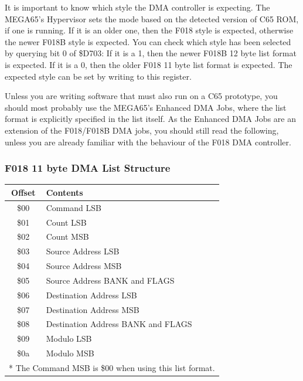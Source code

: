 It is important to know which style the DMA controller is expecting.  The MEGA65's Hypervisor sets the mode based on
the detected version of C65 ROM, if one is running. If it is an older one, then the F018 style is expected, otherwise
the newer F018B style is expected.  You can check which style has been selected by querying bit 0 of \$D703: If it is
a 1, then the newer F018B 12 byte list format is expected. If it is a 0, then the older F018 11 byte list format is expected.
The expected style can be set by writing to this register.

Unless you are writing software that must also run
on a C65 prototype, you should most probably use the MEGA65's Enhanced DMA Jobs, where the list format is explicitly specified
in the list itself.  As the Enhanced DMA Jobs are an extension of the F018/F018B DMA jobs, you should still read the following,
unless you are already familiar with the behaviour of the F018 DMA controller.

\subsubsection{F018 11 byte DMA List Structure}
\begin{center}
\begin{tabular}{|c|l|}
  \hline
  Offset & Contents \\
  \hline
  \$00 & Command LSB \\
  \$01 & Count LSB \\
  \$02 & Count MSB \\
  \$03 & Source Address LSB  \\
  \$04 & Source Address MSB \\
  \$05 & Source Address BANK and FLAGS \\
  \$06 & Destination Address LSB  \\
  \$07 & Destination Address MSB \\
  \$08 & Destination Address BANK and FLAGS \\
  \$09 & Modulo LSB \\
  \$0a & Modulo MSB \\
  \hline
  \multicolumn{2}{l}{* The Command MSB is \$00 when using this list format.}

\end{tabular}
\end{center}

